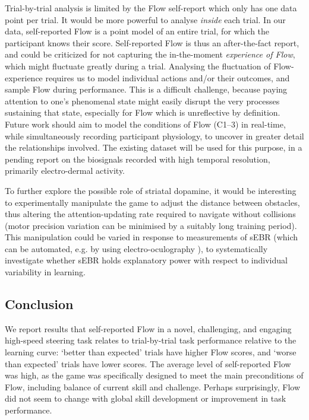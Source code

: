 \documentclass[a4paper,doc,floatsintext,natbib,10pt]{apa6}
\begin{document}
Trial-by-trial analysis is limited by the Flow self-report which only has one data point per trial. It would be more powerful to analyse {\it inside} each trial. In our data, self-reported Flow is a point model of an entire trial, for which the participant knows their score. Self-reported Flow is thus an after-the-fact report, and could be criticized for not capturing the in-the-moment {\it experience of Flow}, which might fluctuate greatly during a trial. Analysing the fluctuation of Flow-experience requires us to model individual actions and/or their outcomes, and sample Flow during performance. This is a difficult challenge, because paying attention to one's phenomenal state might easily disrupt the very processes sustaining that state, especially for Flow which is unreflective by definition. Future work should aim to model the conditions of Flow ({\sf C1--3}) in real-time, while simultaneously recording participant physiology, to uncover in greater detail the relationships involved. The existing dataset will be used for this purpose, in a pending report on the biosignals recorded with high temporal resolution, primarily electro-dermal activity.

To further explore the possible role of striatal dopamine, it would be interesting to experimentally manipulate the game to adjust the distance between obstacles, thus altering the attention-updating rate required to navigate without collisions (motor precision variation can be minimised by a suitably long training period). This manipulation could be varied in response to measurements of sEBR (which can be automated, e.g. by using electro-oculography \citep{toivanen2014}), to systematically investigate whether sEBR holds explanatory power with respect to individual variability in learning.


\subsection*{Conclusion}

We report results that self-reported Flow in a novel, challenging, and engaging high-speed steering task relates to trial-by-trial task performance relative to the learning curve: `better than expected' trials have higher Flow scores, and `worse than expected' trials have lower scores. The average level of self-reported Flow was high, as the game was specifically designed to meet the main preconditions of Flow, including balance of current skill and challenge. Perhaps surprisingly, Flow did not seem to change with global skill development or improvement in task performance.
\end{document}
